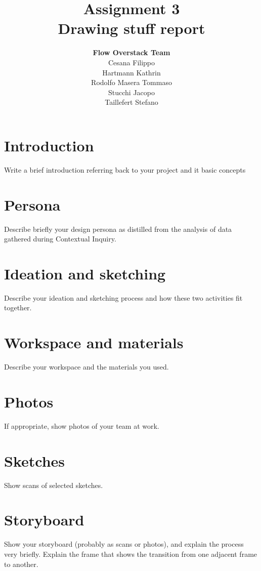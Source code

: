 \documentclass[12pt]{scrartcl}
\title{Assignment 3\\ Drawing stuff report}
\author{\textbf{Flow Overstack Team}\\ Cesana Filippo\\ Hartmann Kathrin\\ Rodolfo Masera Tommaso\\ Stucchi Jacopo\\ Taillefert Stefano}
\date{}
\begin{document}
\maketitle

\section{Introduction}

	Write a brief introduction referring back to your project and it basic concepts 

\section{Persona}

	Describe briefly your design persona as distilled from the analysis of data gathered during Contextual Inquiry.

\section{Ideation and sketching}

	Describe your ideation and sketching process and how these two activities fit together.

\section{Workspace and materials}

	Describe your workspace and the materials you used.
	
\section{Photos}

	If appropriate, show photos of your team at work.
	
\section{Sketches}
	
	Show scans of selected sketches.
	
\section{Storyboard}
	
	Show your storyboard (probably as scans or photos), and explain the process very briefly. Explain the frame that shows the transition from one adjacent frame to another.
\end{document}
